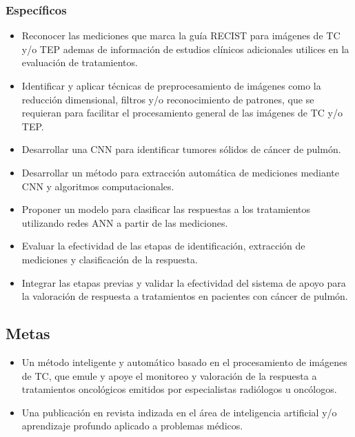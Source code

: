 \documentclass[11pt,a4paper,openany]{article}
\begin{document}
        \subsubsection{Específicos}
        \begin{itemize}
    
            \item Reconocer las mediciones que marca la guía RECIST para imágenes de TC y/o TEP ademas de información de estudios clínicos adicionales utilices en la evaluación de tratamientos.
            
            \item Identificar y aplicar técnicas de preprocesamiento de imágenes como la reducción dimensional, filtros y/o reconocimiento de patrones, que se requieran para facilitar el procesamiento general de las imágenes de TC y/o TEP.

            \item  Desarrollar una CNN para identificar tumores sólidos de cáncer de pulmón. 

            \item  Desarrollar un método para extracción automática de mediciones mediante CNN y algoritmos computacionales. 

            \item Proponer un modelo para clasificar las respuestas a los tratamientos utilizando redes ANN a partir de las mediciones. 

            \item Evaluar la efectividad de las etapas de identificación, extracción de mediciones y clasificación de la respuesta.

            \item Integrar las etapas previas y validar la efectividad del sistema de apoyo para la valoración de respuesta a tratamientos en pacientes con cáncer de pulmón.
        \end{itemize}
        
    \subsection{Metas}
    \begin{itemize}
        \item Un método inteligente y automático basado en el procesamiento de imágenes de TC, que emule y apoye el monitoreo y valoración de la respuesta a tratamientos oncológicos emitidos por especialistas radiólogos u oncólogos.
    
        \item Una publicación en revista indizada en el área de inteligencia artificial y/o aprendizaje profundo aplicado a problemas médicos.
    
    \end{itemize}
\end{document}
